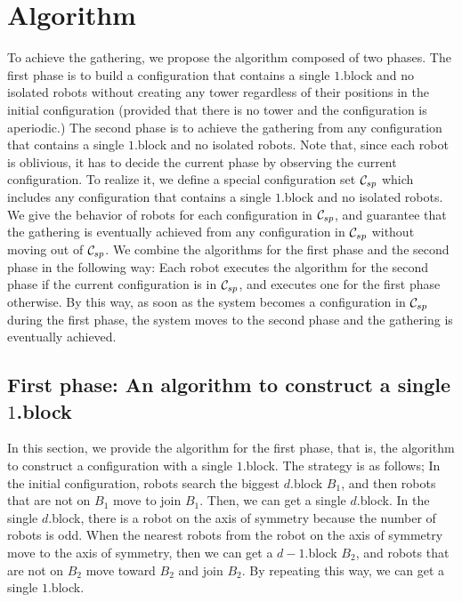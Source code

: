 \documentclass[11pt]{article}
\newcommand{\CONF}{{\cal C}}
\begin{document}
\section{Algorithm}\label{sec:Algo}



To achieve the gathering, we propose the algorithm composed of two phases. The first phase is to build a configuration that contains a single $1$.block and no isolated robots without creating any tower regardless of their positions in the initial configuration (provided that there is no tower and the configuration is aperiodic.)
The second phase is to achieve the gathering from any configuration that contains a single $1$.block and no isolated robots. 
Note that, since each robot is oblivious, it has to decide the current phase by observing the current configuration. 
To realize it, we define a special configuration set $\CONF_{sp}$ which includes any configuration that contains a single $1$.block and no isolated robots. 
We give the behavior of robots for each configuration in $\CONF_{sp}$, and guarantee that the gathering is eventually achieved from any configuration in $\CONF_{sp}$ without moving out of $\CONF_{sp}$. We combine the algorithms for the first phase and the second phase in the following way: Each robot executes the algorithm for the second phase if the current configuration is in $\CONF_{sp}$, and executes one for the first phase otherwise. By this way, as soon as the system becomes a configuration in $\CONF_{sp}$ during the first phase, the system moves to the second phase and the gathering is eventually achieved.

\subsection{First phase: An algorithm to construct a single $1$.block}

In this section, we provide the algorithm for the first phase, that is, the algorithm to construct a configuration with a single $1$.block. The strategy is as follows; 
In the initial configuration, robots search the biggest $d$.block $B_1$, and then robots that are not on $B_1$ move to join $B_1$.
Then, we can get a single $d$.block.
In the single $d$.block, there is a robot on the axis of symmetry because the number of robots is odd.
When the nearest robots from the robot on the axis of symmetry move to the axis of symmetry, then we can get a $d-1$.block $B_2$,
and robots that are not on $B_2$ move toward $B_2$ and join $B_2$.
By repeating this way, we can get a single $1$.block. 
\end{document}
